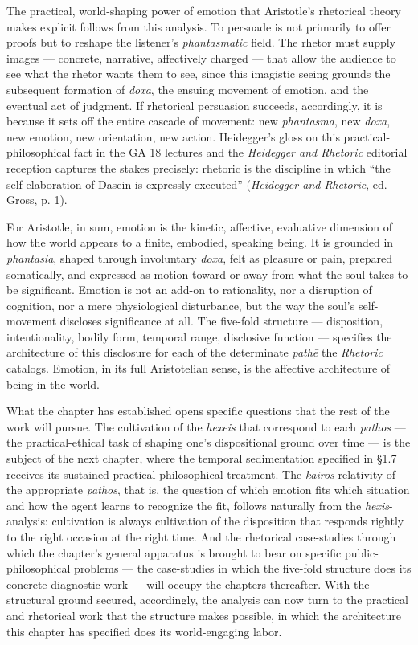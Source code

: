 The practical, world-shaping power of emotion that Aristotle's rhetorical theory makes explicit follows from this analysis. To persuade is not primarily to offer proofs but to reshape the listener's \textit{phantasmatic} field. The rhetor must supply images --- concrete, narrative, affectively charged --- that allow the audience to see what the rhetor wants them to see, since this imagistic seeing grounds the subsequent formation of \textit{doxa}, the ensuing movement of emotion, and the eventual act of judgment. If rhetorical persuasion succeeds, accordingly, it is because it sets off the entire cascade of movement: new \textit{phantasma}, new \textit{doxa}, new emotion, new orientation, new action. Heidegger's gloss on this practical-philosophical fact in the GA 18 lectures and the \textit{Heidegger and Rhetoric} editorial reception captures the stakes precisely: rhetoric is the discipline in which ``the self-elaboration of Dasein is expressly executed'' (\textit{Heidegger and Rhetoric}, ed. Gross, p. 1).

For Aristotle, in sum, emotion is the kinetic, affective, evaluative dimension of how the world appears to a finite, embodied, speaking being. It is grounded in \textit{phantasia}, shaped through involuntary \textit{doxa}, felt as pleasure or pain, prepared somatically, and expressed as motion toward or away from what the soul takes to be significant. Emotion is not an add-on to rationality, nor a disruption of cognition, nor a mere physiological disturbance, but the way the soul's self-movement discloses significance at all. The five-fold structure --- disposition, intentionality, bodily form, temporal range, disclosive function --- specifies the architecture of this disclosure for each of the determinate \textit{pathē} the \textit{Rhetoric} catalogs. Emotion, in its full Aristotelian sense, is the affective architecture of being-in-the-world.

What the chapter has established opens specific questions that the rest of the work will pursue. The cultivation of the \textit{hexeis} that correspond to each \textit{pathos} --- the practical-ethical task of shaping one's dispositional ground over time --- is the subject of the next chapter, where the temporal sedimentation specified in \S1.7 receives its sustained practical-philosophical treatment. The \textit{kairos}-relativity of the appropriate \textit{pathos}, that is, the question of which emotion fits which situation and how the agent learns to recognize the fit, follows naturally from the \textit{hexis}-analysis: cultivation is always cultivation of the disposition that responds rightly to the right occasion at the right time. And the rhetorical case-studies through which the chapter's general apparatus is brought to bear on specific public-philosophical problems --- the case-studies in which the five-fold structure does its concrete diagnostic work --- will occupy the chapters thereafter. With the structural ground secured, accordingly, the analysis can now turn to the practical and rhetorical work that the structure makes possible, in which the architecture this chapter has specified does its world-engaging labor.
